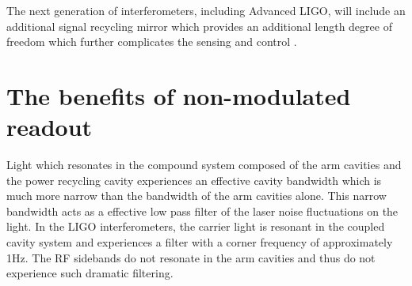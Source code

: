 The next generation of interferometers, including Advanced LIGO, will include an additional signal recycling mirror which provides an additional length degree of freedom which further complicates the sensing and control .



\section{The benefits of non-modulated readout}
Light which resonates in the compound system composed of the arm cavities and the power recycling cavity experiences an effective cavity bandwidth which is much more narrow than the bandwidth of the arm cavities alone. %
 This narrow bandwidth acts as a effective low pass filter of the laser noise fluctuations on the light. %
In the LIGO interferometers, the carrier light is resonant in the coupled cavity system and experiences a filter with a corner frequency of approximately 1Hz. %
The RF sidebands do not resonate in the arm cavities and thus do not experience such dramatic filtering.




